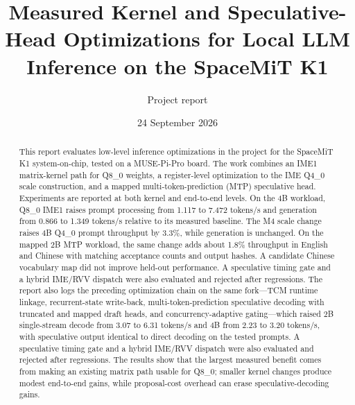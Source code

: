 \documentclass[10pt,twocolumn]{article}
\title{Measured Kernel and Speculative-Head Optimizations for Local LLM Inference on the SpaceMiT K1}
\author{Project report}
\date{24 September 2026}
\begin{document}
\maketitle

\begin{abstract}
This report evaluates low-level inference optimizations in the project for the SpaceMiT K1 system-on-chip, tested on a MUSE-Pi-Pro board. The work combines an IME1 matrix-kernel path for Q8\_0 weights, a register-level optimization to the IME Q4\_0 scale construction, and a mapped multi-token-prediction (MTP) speculative head. Experiments are reported at both kernel and end-to-end levels. On the 4B workload, Q8\_0 IME1 raises prompt processing from 1.117 to 7.472 tokens/s and generation from 0.866 to 1.349 tokens/s relative to its measured baseline. The M4 scale change raises 4B Q4\_0 prompt throughput by 3.3\%, while generation is unchanged. On the mapped 2B MTP workload, the same change adds about 1.8\% throughput in English and Chinese with matching acceptance counts and output hashes. A candidate Chinese vocabulary map did not improve held-out performance. A speculative timing gate and a hybrid IME/RVV dispatch were also evaluated and rejected after regressions. The report also logs the preceding optimization chain on the same fork---TCM runtime linkage, recurrent-state write-back, multi-token-prediction speculative decoding with truncated and mapped draft heads, and concurrency-adaptive gating---which raised 2B single-stream decode from 3.07 to 6.31 tokens/s and 4B from 2.23 to 3.20 tokens/s, with speculative output identical to direct decoding on the tested prompts. A speculative timing gate and a hybrid IME/RVV dispatch were also evaluated and rejected after regressions. The results show that the largest measured benefit comes from making an existing matrix path usable for Q8\_0; smaller kernel changes produce modest end-to-end gains, while proposal-cost overhead can erase speculative-decoding gains.
\end{abstract}
\end{document}
